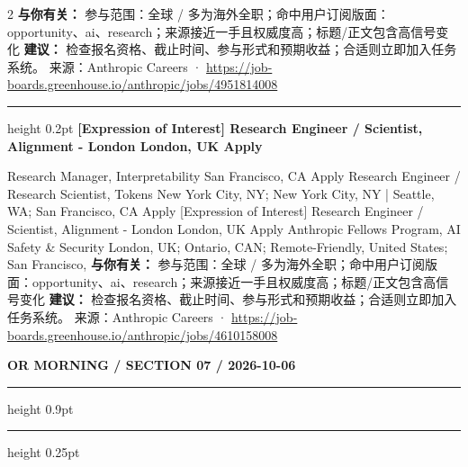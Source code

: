 \documentclass[10.5pt]{ctexart}
\begin{document}
\begin{multicols}{2}
\textbf{与你有关：} 参与范围：全球 / 多为海外全职；命中用户订阅版面：opportunity、ai、research；来源接近一手且权威度高；标题/正文包含高信号变化
\textbf{建议：} 检查报名资格、截止时间、参与形式和预期收益；合适则立即加入任务系统。
{\footnotesize\color{ormuted} 来源：Anthropic Careers · \url{https://job-boards.greenhouse.io/anthropic/jobs/4951814008}}
\vspace{2mm}
\hrule height 0.2pt
\vspace{2mm}
{\large\bfseries [Expression of Interest] Research Engineer / Scientist, Alignment - London London, UK Apply}\par
[Expression of Interest] Research Manager, Interpretability San Francisco, CA Apply Research Engineer / Research Scientist, Tokens New York City, NY; New York City, NY | Seattle, WA; San Francisco, CA Apply [Expression of Interest] Research Engineer / Scientist, Alignment - London London, UK Apply Anthropic Fellows Program, AI Safety \& Security London, UK; Ontario, CAN; Remote-Friendly, United States; San Francisco, 
\textbf{与你有关：} 参与范围：全球 / 多为海外全职；命中用户订阅版面：opportunity、ai、research；来源接近一手且权威度高；标题/正文包含高信号变化
\textbf{建议：} 检查报名资格、截止时间、参与形式和预期收益；合适则立即加入任务系统。
{\footnotesize\color{ormuted} 来源：Anthropic Careers · \url{https://job-boards.greenhouse.io/anthropic/jobs/4610158008}}
\end{multicols}
\newpage
{\small\bfseries OR MORNING / SECTION 07 / 2026-10-06}
\vspace{2mm}
\hrule height 0.9pt
\vspace{1.5mm}
\hrule height 0.25pt
\vspace{4mm}
\end{document}
